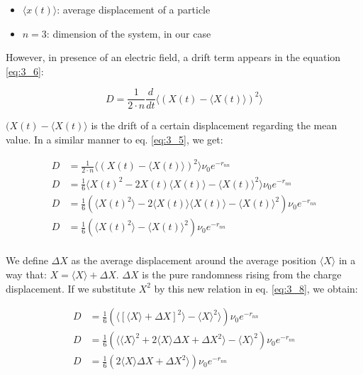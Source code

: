 \begin{itemize}
    \item $\langle x(t) \rangle$: average displacement of a particle
    \item $n = 3$: dimension of the system, in our case
\end{itemize}

However, in presence of an electric field, a drift term appears in the equation \ref{eq:3_6}:

\begin{equation}
    D = \frac{1}{2 \cdot n} \frac{d}{d t} \langle (X(t) - \langle X(t) \rangle)^2 \rangle
    \label{eq:3_7}
\end{equation}

$(X(t) - \langle X(t) \rangle$ is the drift of a certain displacement regarding the mean value. In a similar manner to eq. \ref{eq:3_5}, we get:

\begin{equation}
    \begin{aligned}
        D &= \frac{1}{2 \cdot n} \langle (X(t) - \langle X(t) \rangle)^2 \rangle \nu_0 e^{-r_{nn}} \\
        D &= \frac{1}{6} \langle X(t)^2 - 2X(t)\langle X(t) \rangle - \langle X(t) \rangle^2 \rangle \nu_0 e^{-r_{nn}} \\
        D &= \frac{1}{6} (\langle X(t)^2 \rangle - 2 \langle X(t)\rangle \langle X(t) \rangle - \langle X(t) \rangle^2) \nu_0 e^{-r_{nn}} \\
        D &= \frac{1}{6} (\langle X(t)^2 \rangle - \langle X(t) \rangle^2) \nu_0 e^{-r_{nn}} \\
    \end{aligned}
    \label{eq:3_8}
\end{equation}

We define $\Delta X$ as the average displacement around the average position $\langle X \rangle$ in a way that: $X = \langle X \rangle + \Delta X$. $\Delta X$ is the pure randomness rising from the charge displacement. If we substitute $X^2$ by this new relation in eq. \ref{eq:3_8}, we obtain:

\begin{equation}
    \begin{aligned}
        D &= \frac{1}{6} (\langle [\langle X \rangle + \Delta X]^2 \rangle - \langle X \rangle^2 \rangle) \nu_0 e^{-r_{nn}} \\
        D &= \frac{1}{6} (\langle \langle X \rangle^2 + 2\langle X \rangle\Delta X + \Delta X^2 \rangle - \langle X \rangle^2) \nu_0 e^{-r_{nn}} \\
        D &= \frac{1}{6} (2\langle X \rangle\Delta X + \Delta X^2 \rangle) \nu_0 e^{-r_{nn}} \\
    \end{aligned}
    \label{eq:3_9}
\end{equation}

